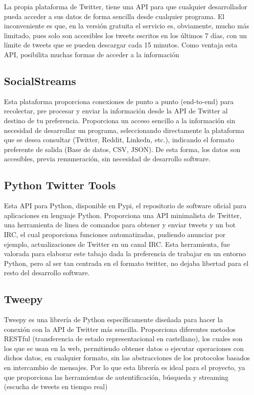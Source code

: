 La propia plataforma de Twitter, tiene una API para que cualquier desarrollador pueda acceder a sus datos de forma sencilla desde cualquier programa. El inconveniente es que, en la versión gratuita el servicio es, obviamente, mucho más limitado, pues solo son accesibles los tweets escritos en los últimos 7 días, con un límite de tweets que se pueden descargar cada 15 minutos. Como ventaja esta API, posibilita muchas formas de acceder a la información

\subsection{SocialStreams} 
Esta plataforma proporciona conexiones de punto a punto (end-to-end) para recolectar, pre procesar y enviar la información desde la API de Twitter al destino de tu preferencia. Proporciona un acceso sencillo a la información sin necesidad de desarrollar un programa, seleccionando directamente la plataforma que se desea consultar (Twitter, Reddit, Linkedn, etc.), indicando el formato preferente de salida (Base de datos, CSV, JSON). De esta forma, los datos son accesibles, previa remuneración, sin necesidad de desarrollo software. 

\subsection{Python Twitter Tools}

Esta API para Python, disponible en Pypi, el repositorio de software oficial para aplicaciones en lenguaje Python. Proporciona una API minimalista de Twitter, una herramienta de linea de comandos para obtener y enviar tweets y un bot IRC, el cual proporciona funciones automatizadas, pudiendo anunciar por ejemplo, actualizaciones de Twitter en un canal IRC. Esta herramienta, fue valorada para elaborar este tabajo dada la preferencia de trabajar en un entorno Python, pero al ser tan centrada en el formato twitter, no dejaba libertad para el resto del desarrollo software.

\subsection{Tweepy}

Tweepy es una librería de Python específicamente diseñada para hacer la conexión con la API de Twitter más sencilla. Proporciona diferentes metodos RESTful (transferencia de estado representacional en castellano), los cuales son los que se usan en la web, permitiendo obtener datos o ejecutar operaciones con dichos datos, en cualquier formato, sin las abstracciones de los protocolos basados en intercambio de mensajes. Por lo que esta librería es ideal para el proyecto, ya que proporciona las herramientas de autentificación, búsqueda y streaming (escucha de tweets en tiempo real)


